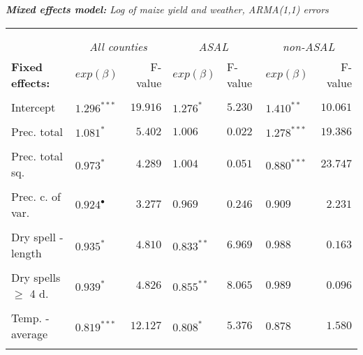 \documentclass[a4paper,12pt]{article}
\begin{document}
{
\begin{threeparttable}
\singlespacing
\caption{\textit{\textbf{Mixed  effects model:} Log of maize yield and weather, ARMA(1,1) errors}}
\label{KenARe11} 
\begin{footnotesize}

\begin{tabular}{llrlllr} 

\hline \vspace{-0.2cm} \\
\vspace{-0.2cm} \\
  \multicolumn{1}{l}{\vspace{0.1cm}\textbf{ }}  &\multicolumn{2}{c}{\textit{All counties}} &\multicolumn{2}{c}{\textit{ASAL}} &\multicolumn{2}{c}{\textit{non-ASAL}}\\
    \multicolumn{1}{l}{\vspace{0.1cm}\textbf{Fixed effects:}}&$exp(\beta)$&F-value\tnote{a}%
    &$exp(\beta)$&F-value\tnote{a}&$exp(\beta)$&F-value\tnote{a}\\
 \hline 
\hline
\\
\vspace{-0.2cm}Intercept&$1.296^{***}$&$19.916$&$1.276^{*}$&$5.230$&$1.410^{**}$&$10.061$\\
  \\
\vspace{-0.2cm}Prec. total&$1.081^{*}$&$5.402$&$1.006^{}$&$0.022$&$1.278^{***}$&$19.386$\\
  \\
  \vspace{-0.2cm}Prec. total sq.&$0.973^{*}$&$4.289$&$1.004$&$0.051$&$0.880^{***}$&$23.747$\\
    \\
      \vspace{-0.2cm}Prec. c. of var.&$0.924^{\bullet}$&$3.277$&$0.969$ &$0.246$&$0.909^{}$&$2.231$\\
  \\

         \vspace{-0.2cm}Dry spell -length&$0.935^{*}$&$4.810$&$0.833^{**}$&$6.969$&$ 0.988^{}$&$0.163$\\
  \\
        \vspace{-0.2cm}Dry spells 	$\geq$ 4 d.&$0.939^{*}$&$4.826$&$0.855^{**}$&$8.065$&$0.989^{}$&$0.096$\\
  \\
          \vspace{-0.2cm}Temp. - average&$0.819^{***}$&$12.127$&$0.808^{*}$&$5.376$&$0.878$ $^{}$&$1.580$\\
  \\
  

\end{tabular}
\end{footnotesize}
\end{threeparttable}}
\end{document}
